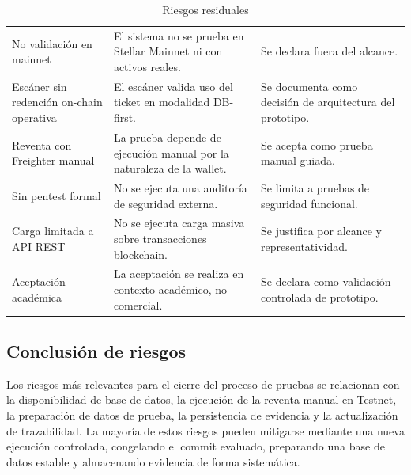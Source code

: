 \documentclass[12pt,letterpaper]{article}
\begin{document}
\begin{table}[H]
\centering
\begingroup
\scriptsize
\setlength{\tabcolsep}{3pt}
\renewcommand{\arraystretch}{1.18}

\begin{tabularx}{\textwidth}{|
>{\raggedright\arraybackslash}p{3.6cm}|
>{\raggedright\arraybackslash}X|
>{\raggedright\arraybackslash}p{3.4cm}|}
\hline
\multicolumn{1}{|>{\centering\arraybackslash}m{3.6cm}|}{\textbf{Riesgo residual}} &
\multicolumn{1}{>{\centering\arraybackslash}m{7.3cm}|}{\textbf{Descripción}} &
\multicolumn{1}{>{\centering\arraybackslash}m{3.4cm}|}{\textbf{Tratamiento}} \\
\hline
No validación en mainnet & El sistema no se prueba en Stellar Mainnet ni con activos reales. & Se declara fuera del alcance. \\
\hline
Escáner sin redención on-chain operativa & El escáner valida uso del ticket en modalidad DB-first. & Se documenta como decisión de arquitectura del prototipo. \\
\hline
Reventa con Freighter manual & La prueba depende de ejecución manual por la naturaleza de la wallet. & Se acepta como prueba manual guiada. \\
\hline
Sin pentest formal & No se ejecuta una auditoría de seguridad externa. & Se limita a pruebas de seguridad funcional. \\
\hline
Carga limitada a API REST & No se ejecuta carga masiva sobre transacciones blockchain. & Se justifica por alcance y representatividad. \\
\hline
Aceptación académica & La aceptación se realiza en contexto académico, no comercial. & Se declara como validación controlada de prototipo. \\
\hline
\end{tabularx}

\endgroup
\caption{Riesgos residuales}
\label{tab:riesgos-residuales}
\end{table}

\subsection{Conclusión de riesgos}

Los riesgos más relevantes para el cierre del proceso de pruebas se relacionan con la disponibilidad de base de datos, la ejecución de la reventa manual en Testnet, la preparación de datos de prueba, la persistencia de evidencia y la actualización de trazabilidad. La mayoría de estos riesgos pueden mitigarse mediante una nueva ejecución controlada, congelando el commit evaluado, preparando una base de datos estable y almacenando evidencia de forma sistemática.
\end{document}
